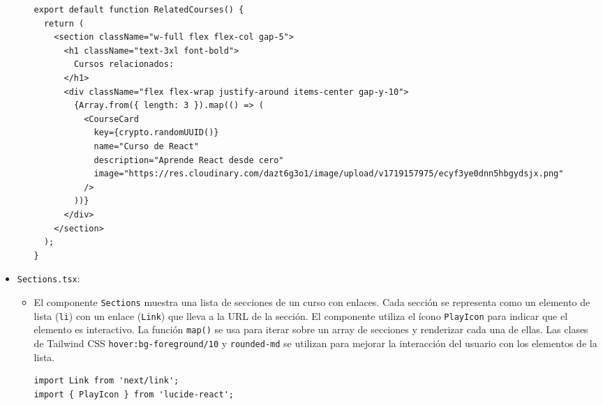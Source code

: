\begin{itemize}
\begin{itemize}
\begin{verbatim}
export default function RelatedCourses() {
  return (
    <section className="w-full flex flex-col gap-5">
      <h1 className="text-3xl font-bold">
        Cursos relacionados:
      </h1>
      <div className="flex flex-wrap justify-around items-center gap-y-10">
        {Array.from({ length: 3 }).map(() => (
          <CourseCard
            key={crypto.randomUUID()}
            name="Curso de React"
            description="Aprende React desde cero"
            image="https://res.cloudinary.com/dazt6g3o1/image/upload/v1719157975/ecyf3ye0dnn5hbgydsjx.png"
          />
        ))}
      </div>
    </section>
  );
}
    \end{verbatim}
  \end{itemize}  
  \item \texttt{Sections.tsx}:
  \begin{itemize}
    \item El componente \texttt{Sections} muestra una lista de secciones de un curso con enlaces. Cada sección se representa como un elemento de lista (\texttt{li}) con un enlace (\texttt{Link}) que lleva a la URL de la sección. El componente utiliza el ícono \texttt{PlayIcon} para indicar que el elemento es interactivo. La función \texttt{map()} se usa para iterar sobre un array de secciones y renderizar cada una de ellas. Las clases de Tailwind CSS \texttt{hover:bg-foreground/10} y \texttt{rounded-md} se utilizan para mejorar la interacción del usuario con los elementos de la lista.
    \begin{verbatim}
import Link from 'next/link';
import { PlayIcon } from 'lucide-react';


\end{verbatim}
\end{itemize}
\end{itemize}

